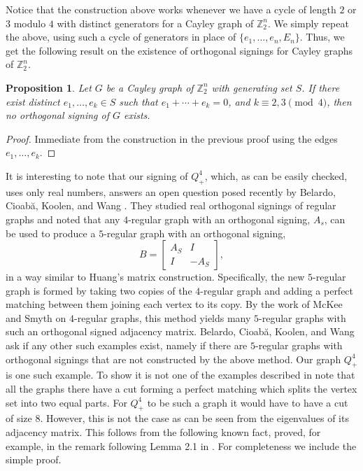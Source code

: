 \documentclass[11pt]{article}
\newtheorem{prop}[theo]{Proposition}
\begin{document}
Notice that the construction above works whenever we have a 
cycle of length $2$ or $3$ modulo $4$ with distinct generators for a Cayley 
graph of $\mathbb{Z}_2^n$. We simply repeat the above, using such a
cycle of generators in place of $\{e_1, \ldots, e_n, E_n\}$. Thus, we get the following result on the existence of orthogonal signings 
for Cayley graphs of $\mathbb{Z}_2^n$.
\begin{prop}
Let $G$ be a Cayley graph of $\mathbb{Z}_2^n$ with generating 
set $S$. If there exist distinct $e_1, \ldots, e_k \in S$ 
such that $e_1 + \cdots + e_k = 0$, and 
$k \equiv 2,3 \pmod{4}$, then no orthogonal signing of $G$ exists.
\end{prop}
\begin{proof}
Immediate from the construction in the previous 
proof using the edges $e_1, \ldots, e_k$.
\end{proof}
It is interesting to note that our signing of $Q_+^4$, which, as can
be easily checked,
uses only real numbers, 
answers an open question posed recently by Belardo, Cioab\u{a}, 
Koolen, and Wang \cite{BCKW}. They studied real orthogonal signings of 
regular graphs and noted that any $4$-regular graph with an orthogonal 
signing, $A_s$, can be used to produce a $5$-regular 
graph with an orthogonal signing,
\[
B=
\left[
\begin{array}{cc}
A_{S} & I \\
I & -A_{S}
\end{array}
\right],
\] 
in a way similar to Huang's matrix construction. Specifically, 
the new $5$-regular graph is formed by taking two copies of the 
$4$-regular graph and adding a perfect matching between them joining
each vertex to its copy. By the work of McKee and Smyth 
\cite{MS} on $4$-regular graphs, this method yields many 
$5$-regular graphs with such an orthogonal signed adjacency matrix. 
Belardo, Cioab\u{a}, Koolen, and Wang ask if any other such examples exist, 
namely if there are $5$-regular graphs with orthogonal signings that
are not constructed by the above method. 
Our graph $Q_+^4$ is one such example. To show it is not one
of the examples described in \cite{BCKW} note
that all the graphs there have a cut forming  a perfect matching which
splits the vertex set into two equal parts. For $Q_+^4$ to be such a 
graph it would have to have a cut of size $8$. However, this is not the 
case as can be seen from the eigenvalues of its adjacency matrix. 
This follows from the following known fact, proved, for example, 
in the remark following Lemma 2.1 in \cite{AM}. 
For completeness we include the simple proof.
\end{document}
